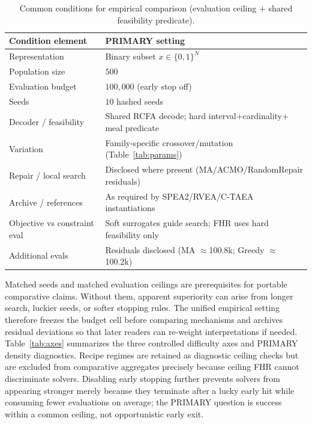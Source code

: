 \documentclass[lettersize,journal]{IEEEtran}
\begin{document}
\begin{table}[!t]
\centering
\caption{Common conditions for empirical comparison (evaluation ceiling $+$ shared feasibility predicate).}
\label{tab:contract}
\scriptsize
\setlength{\tabcolsep}{2.5pt}
\begin{tabular}{@{}lp{5.6cm}@{}}
\toprule
Condition element & PRIMARY setting \\
\midrule
Representation & Binary subset $x\in\{0,1\}^N$ \\
Population size & $500$ \\
Evaluation budget & $100{,}000$ (early stop off) \\
Seeds & $10$ hashed seeds \\
Decoder / feasibility & Shared RCFA decode; hard interval$+$cardinality$+$meal predicate \\
Variation & Family-specific crossover/mutation (Table~\ref{tab:params}) \\
Repair / local search & Disclosed where present (MA/ACMO/RandomRepair residuals) \\
Archive / references & As required by SPEA2/RVEA/C-TAEA instantiations \\
Objective vs constraint eval & Soft surrogates guide search; FHR uses hard feasibility only \\
Additional evals & Residuals disclosed (MA $\approx$100.8k; Greedy $\approx$100.2k) \\
\bottomrule
\end{tabular}
\end{table}

Matched seeds and matched evaluation ceilings are prerequisites for portable comparative claims.
Without them, apparent superiority can arise from longer search, luckier seeds, or softer stopping rules.
The unified empirical setting therefore freezes the budget cell before comparing mechanisms and archives residual deviations so that later readers can re-weight interpretations if needed.
Table~\ref{tab:axes} summarizes the three controlled difficulty axes and PRIMARY density diagnostics.
Recipe regimes are retained as diagnostic ceiling checks but are excluded from comparative aggregates precisely because ceiling FHR cannot discriminate solvers.
Disabling early stopping further prevents solvers from appearing stronger merely because they terminate after a lucky early hit while consuming fewer evaluations on average; the PRIMARY question is success within a common ceiling, not opportunistic early exit.
\end{document}
